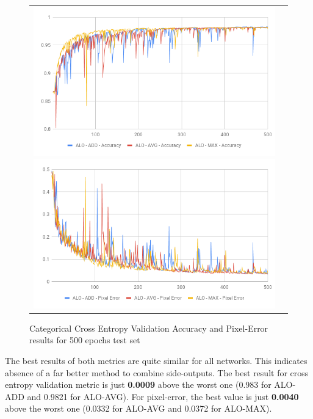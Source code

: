 \begin{figure}
  \caption{Categorical Cross Entropy Validation Accuracy and Pixel-Error results for 500 epochs test set}
  \centering
  \begin{tabular}{ll}
    \includegraphics[width=1.\columnwidth]{figures/falreis/val_acc_500_epochs.png}
  
    \includegraphics[width=1.\columnwidth]{figures/falreis/pixel_error_500_epochs.png}
  \end{tabular}%
  \label{fig:val_acc_500_epochs}
\end{figure}

The best results of both metrics are quite similar for all networks. This indicates absence of a far better method to combine side-outputs. The best result for cross entropy validation metric is just \textbf{0.0009} above the worst one (0.983 for ALO-ADD and 0.9821 for ALO-AVG). For pixel-error, the best value is just \textbf{0.0040} above the worst one (0.0332 for ALO-AVG and 0.0372 for ALO-MAX).

